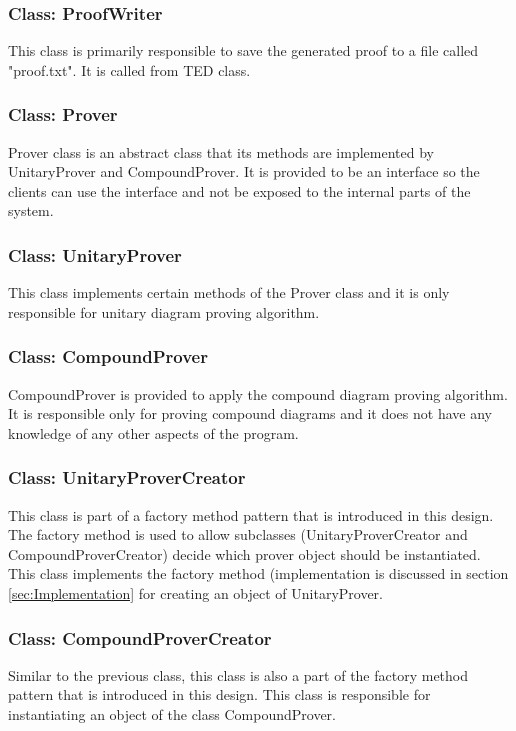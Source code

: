 \documentclass[10pt, a4paper, titlepage]{article}
\begin{document}
\subsubsection{Class: ProofWriter}
This class is primarily responsible to save the generated proof to a file called "proof.txt". It is called from TED class.

\subsubsection{Class: Prover}
Prover class is an abstract class that its methods are implemented by UnitaryProver and CompoundProver. It is provided to be an interface so the clients can use the interface and not be exposed to the internal parts of the system.

\subsubsection{Class: UnitaryProver}
This class implements certain methods of the Prover class and it is only responsible for unitary diagram proving algorithm.  

\subsubsection{Class: CompoundProver}
CompoundProver is provided to apply the compound diagram proving algorithm. It is responsible only for proving compound diagrams and it does not have any knowledge of any other aspects of the program. 

\subsubsection{Class: UnitaryProverCreator}
This class is part of a factory method pattern that is introduced in this design. The factory method is used to allow subclasses (UnitaryProverCreator and CompoundProverCreator) decide which prover object should be instantiated. This class implements the factory method (implementation is discussed in section \ref{sec:Implementation} for creating an object of UnitaryProver.

\subsubsection{Class: CompoundProverCreator}
Similar to the previous class, this class is also a part of the factory method pattern that is introduced in this design. This class is responsible for instantiating an object of the class CompoundProver.
\end{document}
